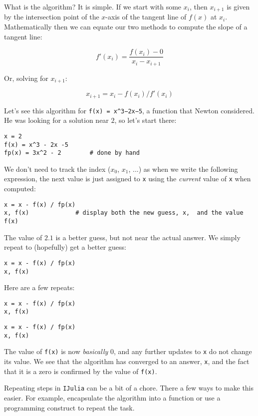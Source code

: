 \documentclass[12pt]{article}
\begin{document}
What is the algorithm? It is simple. If we start with some $x_i$, then
$x_{i+1}$ is given by the intersection point of the $x$-axis of the
tangent line of $f(x)$ at $x_i$. Mathematically then we can equate our
two methods to compute the slope of a tangent line:

\[
f'(x_i) = \frac{f(x_i) - 0}{x_i - x_{i+1}}
\]

Or, solving for $x_{i+1}$:

\[
x_{i+1} = x_i - f(x_i)/f'(x_i)
\]

Let's see this algorithm for \texttt{f(x) = x\^{}3−2x−5}, a function
that Newton considered. He was looking for a solution near $2$, so let's
start there:



\begin{verbatim}
x = 2
f(x) = x^3 - 2x -5
fp(x) = 3x^2 - 2        # done by hand
\end{verbatim}
We don't need to track the index ($x_0$, $x_1$, ...) as when we write
the following expression, the next value is just assigned to \texttt{x}
using the \emph{current} value of \texttt{x} when computed:



\begin{verbatim}
x = x - f(x) / fp(x)
x, f(x)             # display both the new guess, x,  and the value f(x)
\end{verbatim}
The value of $2.1$ is a better guess, but not near the actual answer. We
simply repeat to (hopefully) get a better guess:



\begin{verbatim}
x = x - f(x) / fp(x)
x, f(x)
\end{verbatim}
Here are a few repeats:



\begin{verbatim}
x = x - f(x) / fp(x)
x, f(x)
\end{verbatim}


\begin{verbatim}
x = x - f(x) / fp(x)
x, f(x)
\end{verbatim}
The value of \texttt{f(x)} is now \emph{basically} 0, and any further
updates to \texttt{x} do not change its value. We see that the algorithm
has converged to an answer, \texttt{x}, and the fact that it is a zero
is confirmed by the value of \texttt{f(x)}.

Repeating steps in \texttt{IJulia} can be a bit of a chore. There a few
ways to make this easier. For example, encapsulate the algorithm into a
function or use a programming construct to repeat the task.
\end{document}
